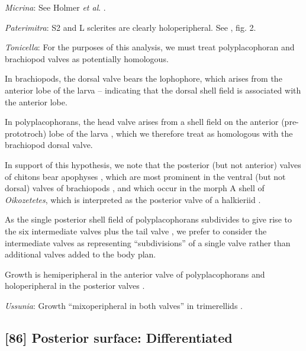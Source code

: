 \documentclass[openany]{book}
\theoremstyle{definition}
\theoremstyle{definition}
\theoremstyle{definition}
\theoremstyle{remark}
\begin{document}
\hypertarget{Micrina-coding-85}{}
\emph{Micrina}: See Holmer \emph{et al}.
\citeyearpar{Holmer2008TheEarly}.

\hypertarget{Paterimitra-coding-85}{}
\emph{Paterimitra}: S2 and L sclerites are clearly holoperipheral. See
\citet{Larsson2014iPaterimitra}, fig. 2.

\hypertarget{Tonicella-coding-85}{}
\emph{Tonicella}: For the purposes of this analysis, we must treat
polyplacophoran and brachiopod valves as potentially homologous.

In brachiopods, the dorsal valve bears the lophophore, which arises from
the anterior lobe of the larva \citep{Altenburger2013} -- indicating
that the dorsal shell field is associated with the anterior lobe.

In polyplacophorans, the head valve arises from a shell field on the
anterior (pre-prototroch) lobe of the larva \citep{Wanninger2002C},
which we therefore treat as homologous with the brachiopod dorsal valve.

In support of this hypothesis, we note that the posterior (but not
anterior) valves of chitons bear apophyses
\citep{Schwabe2010, Connors2012}, which are most prominent in the
ventral (but not dorsal) valves of brachiopods \citep[fig.
322]{Williams1997Introduction}, and which occur in the morph A shell of
\emph{Oikozetetes}, which is interpreted as the posterior valve of a
halkieriid \citep{Paterson2009}.

As the single posterior shell field of polyplacophorans subdivides to
give rise to the six intermediate valves plus the tail valve
\citep{Wanninger2002C}, we prefer to consider the intermediate valves as
representing ``subdivisions'' of a single valve rather than additional
valves added to the body plan.

Growth is hemiperipheral in the anterior valve of polyplacophorans and
holoperipheral in the posterior valves \citep{Schwabe2010, Connors2012}.

\hypertarget{Ussunia-coding-85}{}
\emph{Ussunia}: Growth ``mixoperipheral in both valves'' in trimerellids
\citep{Williams2000LinguliformeaCraniiformea, Popov1997}.

\subsection*{{[}86{]} Posterior surface:
Differentiated}\label{posterior-surface-differentiated}
\end{document}
